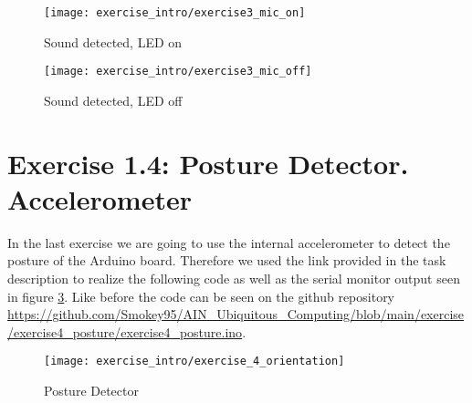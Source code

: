 \begin{figure}[h]
  \centering
  \texttt{[image: exercise\_intro/exercise3\_mic\_on]}
  \caption{Sound detected, LED on}
  \label{fig:microphone_on}
\end{figure}

\begin{figure}[h]
  \centering
  \texttt{[image: exercise\_intro/exercise3\_mic\_off]}
  \caption{Sound detected, LED off}
  \label{fig:microphone_off}
\end{figure}


\section{Exercise 1.4: Posture Detector. Accelerometer}

In the last exercise we are going to use the internal accelerometer to detect the posture of the Arduino board.
Therefore we used the link provided in the task description to realize the following code as well as the serial monitor output seen in figure \ref{posture_detector}.
Like before the code can be seen on the github repository \url{https://github.com/Smokey95/AIN_Ubiquitous_Computing/blob/main/exercise/exercise4_posture/exercise4_posture.ino}.

\begin{figure}[h]
  \centering
  \texttt{[image: exercise\_intro/exercise\_4\_orientation]}
  \caption{Posture Detector}
  \label{posture_detector}
\end{figure}